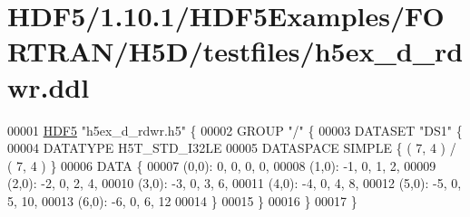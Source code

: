 \hypertarget{_h_d_f5_21_810_81_2_h_d_f5_examples_2_f_o_r_t_r_a_n_2_h5_d_2testfiles_2h5ex__d__rdwr_8ddl_source}{}\section{H\+D\+F5/1.10.1/\+H\+D\+F5\+Examples/\+F\+O\+R\+T\+R\+A\+N/\+H5\+D/testfiles/h5ex\+\_\+d\+\_\+rdwr.ddl}
\label{_h_d_f5_21_810_81_2_h_d_f5_examples_2_f_o_r_t_r_a_n_2_h5_d_2testfiles_2h5ex__d__rdwr_8ddl_source}

\begin{DoxyCode}
00001 \hyperlink{namespace_h_d_f5}{HDF5} \textcolor{stringliteral}{"h5ex\_d\_rdwr.h5"} \{
00002 GROUP \textcolor{stringliteral}{"/"} \{
00003    DATASET \textcolor{stringliteral}{"DS1"} \{
00004       DATATYPE  H5T\_STD\_I32LE
00005       DATASPACE  SIMPLE \{ ( 7, 4 ) / ( 7, 4 ) \}
00006       DATA \{
00007       (0,0): 0, 0, 0, 0,
00008       (1,0): -1, 0, 1, 2,
00009       (2,0): -2, 0, 2, 4,
00010       (3,0): -3, 0, 3, 6,
00011       (4,0): -4, 0, 4, 8,
00012       (5,0): -5, 0, 5, 10,
00013       (6,0): -6, 0, 6, 12
00014       \}
00015    \}
00016 \}
00017 \}
\end{DoxyCode}

